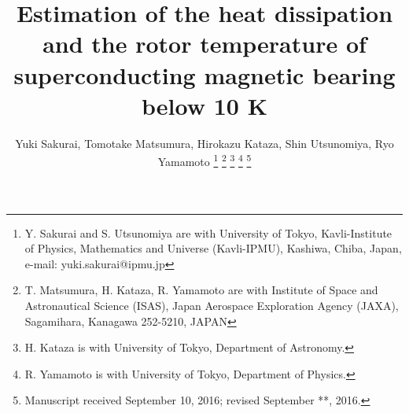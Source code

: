 \documentclass[journal]{IEEEtran}
\begin{document}
%
\title{Estimation of the heat dissipation and the rotor temperature of superconducting magnetic bearing below 10 K}
%
%
%

\author{Yuki Sakurai, Tomotake Matsumura, Hirokazu Kataza, Shin Utsunomiya, Ryo Yamamoto
\thanks{Y. Sakurai and S. Utsunomiya are with University of Tokyo, Kavli-Institute of Physics, Mathematics and Universe (Kavli-IPMU), Kashiwa, Chiba, Japan, e-mail: yuki.sakurai@ipmu.jp}
\thanks{T. Matsumura, H. Kataza, R. Yamamoto are with Institute of Space and Astronautical Science (ISAS), Japan Aerospace Exploration Agency (JAXA), Sagamihara, Kanagawa 252-5210, JAPAN}
\thanks{H. Kataza is with University of Tokyo, Department of Astronomy.}
\thanks{R. Yamamoto is with University of Tokyo, Department of Physics.}
\thanks{Manuscript received September 10, 2016; revised September **, 2016.}}

%
%
\end{document}
